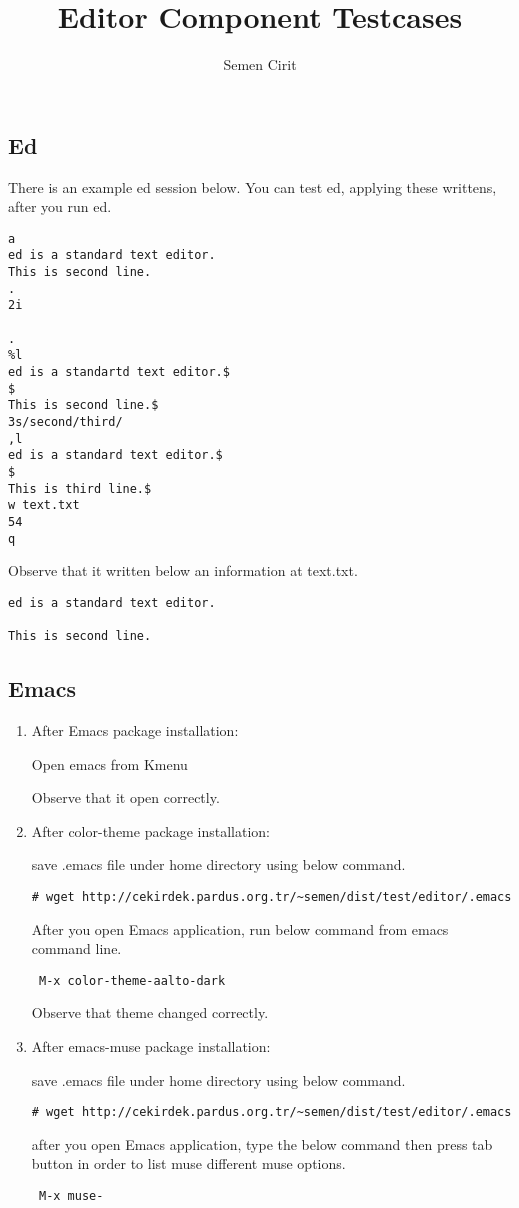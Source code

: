 \documentclass[a4paper,10pt]{article}
\title{Editor Component Testcases}
\author{Semen Cirit}
\begin{document}
\maketitle

\subsection*{Ed}

There is an example ed session below. You can test ed, applying these writtens, after you run ed.

\begin{verbatim}
a
ed is a standard text editor.
This is second line.
.
2i

.
%l
ed is a standartd text editor.$
$
This is second line.$
3s/second/third/
,l
ed is a standard text editor.$
$
This is third line.$
w text.txt
54
q
\end{verbatim}
Observe that it written below an information at text.txt.
\begin{verbatim}
ed is a standard text editor.

This is second line.
\end{verbatim}


\subsection*{Emacs}
\begin{enumerate}
\item After Emacs package installation:

Open emacs from Kmenu

Observe that it open correctly.

\item After color-theme package installation:

save .emacs file under home directory using below command. 
\begin{verbatim}
# wget http://cekirdek.pardus.org.tr/~semen/dist/test/editor/.emacs 
\end{verbatim}

After you open Emacs application, run below command from emacs command line.
\begin{verbatim}
 M-x color-theme-aalto-dark
\end{verbatim}

Observe that theme changed correctly.

\item After emacs-muse package installation:

save .emacs file under home directory using below command.
\begin{verbatim}
# wget http://cekirdek.pardus.org.tr/~semen/dist/test/editor/.emacs 
\end{verbatim}

after you open Emacs application,  type the below command then press tab button in order to list muse different muse options.
\begin{verbatim}
 M-x muse-
\end{verbatim}


\end{enumerate}
\end{document}
